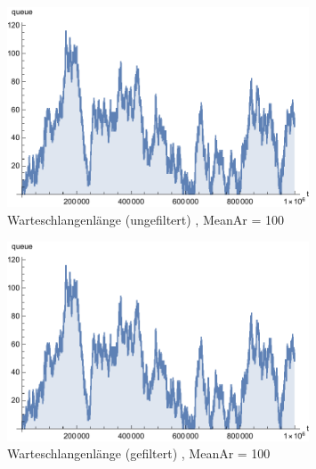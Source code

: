 \begin{figure}[htpb]
	\centering
	\includegraphics[width=0.8\textwidth]{abbildungen/1_Phone/Arrival_100_Serve_100_dur_1000000_Skip_0/QueueStepPlotAll.pdf}
	\caption{Warteschlangenlänge (ungefiltert) , MeanAr = 100}
	\label{fig:QueueStepPlotAll100}
\end{figure} 
\begin{figure}[htpb]
	\centering
	\includegraphics[width=0.8\textwidth]{abbildungen/1_Phone/Arrival_100_Serve_100_dur_1000000_Skip_0/QueueStepPlotAllFiltered.pdf}
	\caption{Warteschlangenlänge (gefiltert) , MeanAr = 100}
	\label{fig:QueueStepPlotAllFiltered100}
\end{figure} 

